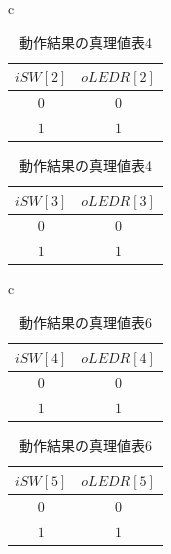 \documentclass[a4paper]{jarticle}
\begin{document}
\begin{table}[H]
	\begin{center}
		\begin{tabular}{c}
			\begin{minipage}{0.5\hsize}
				\begin{center}
					\caption{動作結果の真理値表3}
					\label{Work1TruthTable3}
					\begin{tabular}{|c|c|}
						\hline
						$iSW[2]$	&$oLEDR[2]$\\	\hline\hline
						$0$		&$0$\\		\hline
						$1$		&$1$\\		\hline
					\end{tabular}
				\end{center}
			\end{minipage}
			\begin{minipage}{0.5\hsize}
				\begin{center}
					\caption{動作結果の真理値表4}
					\label{Work1TruthTable4}
					\begin{tabular}{|c|c|}
						\hline
						$iSW[3]$	&$oLEDR[3]$\\	\hline\hline
						$0$		&$0$\\		\hline
						$1$		&$1$\\		\hline
					\end{tabular}
				\end{center}
			\end{minipage}
		\end{tabular}
	\end{center}
\end{table}
\begin{table}[H]
	\begin{center}
		\begin{tabular}{c}
			\begin{minipage}{0.5\hsize}
				\begin{center}
					\caption{動作結果の真理値表5}
					\label{Work1TruthTable5}
					\begin{tabular}{|c|c|}
						\hline
						$iSW[4]$	&$oLEDR[4]$\\	\hline\hline
						$0$		&$0$\\		\hline
						$1$		&$1$\\		\hline
					\end{tabular}
				\end{center}
			\end{minipage}
			\begin{minipage}{0.5\hsize}
				\begin{center}
					\caption{動作結果の真理値表6}
					\label{Work2TruthTable6}
					\begin{tabular}{|c|c|}
						\hline
						$iSW[5]$	&$oLEDR[5]$\\	\hline\hline
						$0$		&$0$\\		\hline
						$1$		&$1$\\		\hline
					\end{tabular}
				\end{center}
			\end{minipage}
		\end{tabular}
	\end{center}
\end{table}
\end{document}
